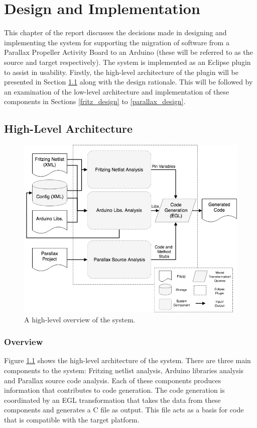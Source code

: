 \documentclass{UoYCSproject}
\begin{document}
\chapter{Design and Implementation}
This chapter of the report discusses the decisions made in designing and implementing the system for supporting the migration of software from a Parallax Propeller Activity Board to an Arduino (these will be referred to as the source and target respectively). The system is implemented as an Eclipse plugin to assist in usability. Firstly, the high-level architecture of the plugin will be presented in Section \ref{high_lev_arch} along with the design rationale. This will be followed by an examination of the low-level architecture and implementation of these components in Sections \ref{fritz_design} to \ref{parallax_design}.


\section{High-Level Architecture} \label{high_lev_arch}
\begin{figure}[h!]
  \centering
  \includegraphics[width=0.8\linewidth]{graphics/high_level_overview.png}
  \caption{A high-level overview of the system.}
  \label{fig:high_level_overview}
\end{figure}

\subsection{Overview}
Figure \ref{fig:high_level_overview} shows the high-level architecture of the system. There are three main components to the system: Fritzing netlist analysis, Arduino libraries analysis and Parallax source code analysis. Each of these components produces information that contributes to code generation. The code generation is coordinated by an EGL transformation that takes the data from these components and generates a C file as output. This file acts as a basis for code that is compatible with the target platform. 
\end{document}
